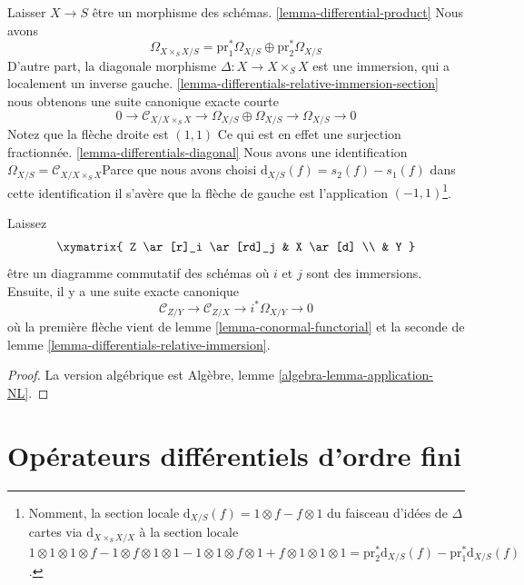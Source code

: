 \begin{remark}

\label{remark-differentials-diagonal}

Laisser $X \to S$ être un morphisme des schémas. \ref{lemma-differential-product}
Nous avons
$$
\Omega_{X \times_S X/S} =
\text{pr}_1^*\Omega_{X/S} \oplus \text{pr}_2^*\Omega_{X/S}
$$
D'autre part, la diagonale morphisme $\Delta : X \to X \times_S X$
est une immersion, qui a localement un inverse gauche. \ref{lemma-differentials-relative-immersion-section}
nous obtenons une suite canonique exacte courte
$$
0 \to \mathcal{C}_{X/X \times_S X} \to \Omega_{X/S} \oplus \Omega_{X/S}
\to \Omega_{X/S} \to 0
$$
Notez que la flèche droite est $(1, 1)$ Ce qui est en effet une surjection fractionnée. \ref{lemma-differentials-diagonal}
Nous avons une identification $\Omega_{X/S} = \mathcal{C}_{X/X \times_S X}$Parce que nous avons choisi $\text{d}_{X/S}(f) = s_2(f) - s_1(f)$ dans cette identification il s'avère que la flèche de gauche est l'application
$(-1, 1)$\footnote{Nomment, la section locale $\text{d}_{X/S}(f) = 1 \otimes f - f \otimes 1$ du faisceau d'idées de $\Delta$ cartes via $\text{d}_{X \times_S X/X}$ à la section locale
$1 \otimes 1 \otimes 1 \otimes f - 1 \otimes f \otimes 1 \otimes 1
-1 \otimes 1 \otimes f \otimes 1 + f \otimes 1 \otimes 1 \otimes 1 =
\text{pr}_2^*\text{d}_{X/S}(f) - \text{pr}_1^*\text{d}_{X/S}(f)$.}.

\end{remark}

\begin{lemma}

\label{lemma-two-immersions}
Laissez $$
\xymatrix{
Z \ar[r]_i \ar[rd]_j & X \ar[d] \\
& Y
}
$$ être un diagramme commutatif des schémas où $i$ et $j$ sont des immersions. Ensuite, il y a une suite exacte canonique $$
\mathcal{C}_{Z/Y} \to
\mathcal{C}_{Z/X} \to
i^*\Omega_{X/Y} \to 0
$$ où la première flèche vient de lemme \ref{lemma-conormal-functorial} et la seconde de lemme \ref{lemma-differentials-relative-immersion}.
\end{lemma}

\begin{proof}
La version algébrique est Algèbre, lemme \ref{algebra-lemma-application-NL}.
\end{proof}










\section{Opérateurs différentiels d'ordre fini}
\label{section-differential-operators}

